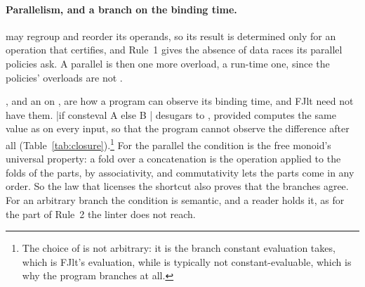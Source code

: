 \paragraph{Parallelism, and a branch on the binding time.}
\label{app:fjlt:consteval}
 may regroup and reorder its operands, so its result is determined only for an operation that  certifies, and Rule~1 gives the absence of data races its parallel policies ask.
A parallel  is then one more overload, a run-time one, since the policies' overloads are not .

, and an  on , are how a program can observe its binding time, and FJlt need not have them.
\cppinline|if consteval { A } else { B }| desugars to , provided  computes the same value as  on every input, so that the program cannot observe the difference after all (Table~\ref{tab:closure}).\footnote{The choice of  is not arbitrary: it is the branch constant evaluation takes, which is FJlt's evaluation, while  is typically not constant-evaluable, which is why the program branches at all.}
For the parallel  the condition is the free monoid's universal property: a fold over a concatenation is the operation applied to the folds of the parts, by associativity, and commutativity lets the parts come in any order.
So the law that licenses the shortcut also proves that the branches agree.
For an arbitrary branch the condition is semantic, and a reader holds it, as for the part of Rule~2 the linter does not reach.

